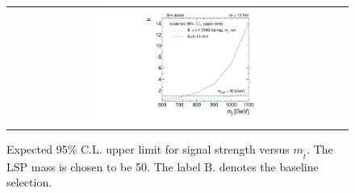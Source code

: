 \begin{figure}[!h]
  \centering
  \begin{tabular}{c}
                \includegraphics[width=0.49\textwidth]{figures/limitplot4BinSel_BaselineTopTagTransverseMassRef_LSP50.pdf} 
  \end{tabular}
  \caption{Expected 95\% C.L. upper limit for signal strength versus $m_{\tilde{t}}$. The LSP mass is chosen to be 50\gev. The label B. denotes the baseline selection.}
  \label{fig:stop_baselinetoptagref_limit}
\end{figure}  

 

